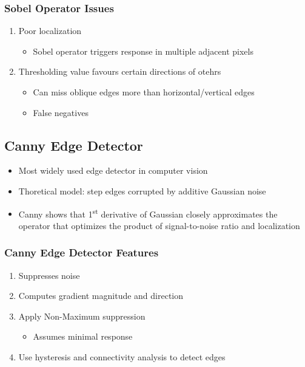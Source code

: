 \documentclass[letterpaper,12pt]{article}
\begin{document}
\subsubsection{Sobel Operator Issues}
\begin{enumerate}
 \item Poor localization
       \begin{itemize}
        \item Sobel operator triggers response in multiple adjacent pixels
       \end{itemize}
 \item Thresholding value favours certain directions of otehrs
       \begin{itemize}
        \item Can miss oblique edges more than horizontal/vertical edges
        \item False negatives
       \end{itemize}
\end{enumerate}

\subsection{Canny Edge Detector}
\begin{itemize}
 \item Most widely used edge detector in computer vision
 \item Thoretical model: step edges corrupted by additive Gaussian noise
 \item Canny shows that 1\textsuperscript{st} derivative of Gaussian closely approximates the operator that optimizes the product of signal-to-noise ratio and localization
\end{itemize}

\subsubsection{Canny Edge Detector Features}
\begin{enumerate}
 \item Suppresses noise
 \item Computes gradient magnitude and direction
 \item Apply Non-Maximum suppression
       \begin{itemize}
        \item Assumes minimal response
       \end{itemize}
 \item Use hysteresis and connectivity analysis to detect edges
\end{enumerate}
\end{document}

